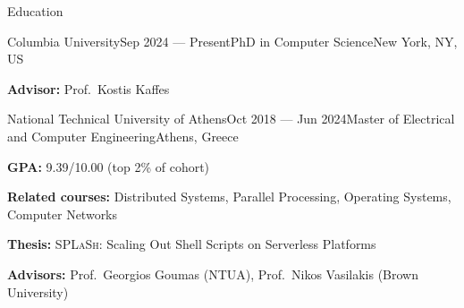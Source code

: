 \documentclass[letterpaper, 12pt]{resume}
\begin{document}

\begin{rSection}{Education}
    \begin{rSubsection}{Columbia University}{Sep 2024 --- Present}{PhD in Computer Science}{New York, NY, US}
        \item \textbf{Advisor:} Prof.\ Kostis Kaffes
    \end{rSubsection}

    \begin{rSubsection}{National Technical University of Athens}{Oct 2018 --- Jun 2024}{Master of Electrical and Computer Engineering}{Athens, Greece}
        \item \textbf{GPA:} 9.39/10.00 (top 2\% of cohort)
        \item \textbf{Related courses:} Distributed Systems, Parallel Processing, Operating Systems, Computer Networks
        \item \textbf{Thesis:} \textsc{SPLaSh}: Scaling Out Shell Scripts on Serverless Platforms
        \item \textbf{Advisors:} Prof.\ Georgios Goumas (NTUA), Prof.\ Nikos Vasilakis (Brown University)
    \end{rSubsection}
\end{rSection}
\end{document}
